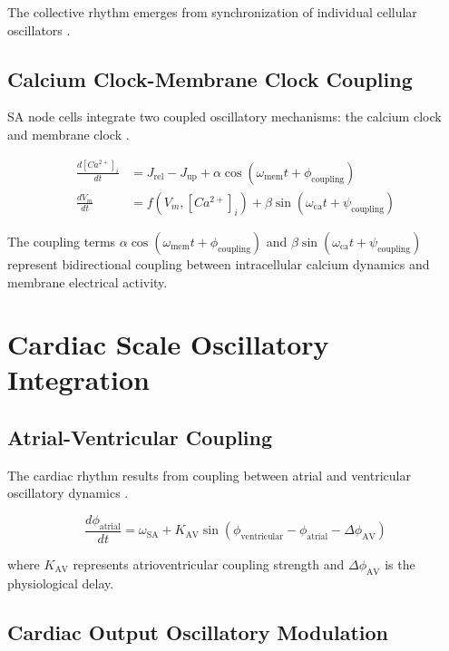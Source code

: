 \documentclass[twocolumn]{article}
\begin{document}
The collective rhythm emerges from synchronization of individual cellular oscillators \citep{michaels1987mechanisms}.

\subsection{Calcium Clock-Membrane Clock Coupling}

SA node cells integrate two coupled oscillatory mechanisms: the calcium clock and membrane clock \citep{maltsev2009synergism}.

\begin{align}
\frac{d[Ca^{2+}]_i}{dt} &= J_{\text{rel}} - J_{\text{up}} + \alpha \cos(\omega_{\text{mem}}t + \phi_{\text{coupling}}) \label{eq:ca_clock} \\
\frac{dV_m}{dt} &= f(V_m, [Ca^{2+}]_i) + \beta \sin(\omega_{\text{ca}}t + \psi_{\text{coupling}}) \label{eq:mem_clock}
\end{align}

The coupling terms $\alpha \cos(\omega_{\text{mem}}t + \phi_{\text{coupling}})$ and $\beta \sin(\omega_{\text{ca}}t + \psi_{\text{coupling}})$ represent bidirectional coupling between intracellular calcium dynamics and membrane electrical activity.

\section{Cardiac Scale Oscillatory Integration}

\subsection{Atrial-Ventricular Coupling}

The cardiac rhythm results from coupling between atrial and ventricular oscillatory dynamics \citep{keener2009mathematical}.

\begin{equation}
\frac{d\phi_{\text{atrial}}}{dt} = \omega_{\text{SA}} + K_{\text{AV}} \sin(\phi_{\text{ventricular}} - \phi_{\text{atrial}} - \Delta\phi_{\text{AV}})
\label{eq:av_coupling}
\end{equation}

where $K_{\text{AV}}$ represents atrioventricular coupling strength and $\Delta\phi_{\text{AV}}$ is the physiological delay.

\subsection{Cardiac Output Oscillatory Modulation}
\end{document}
